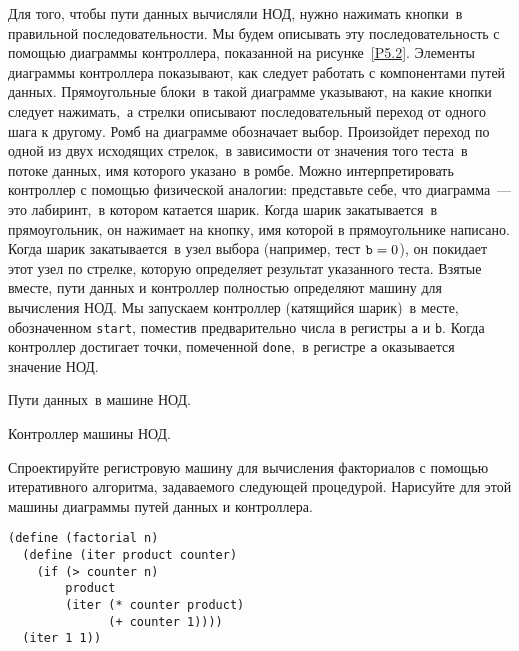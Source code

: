 Для того, чтобы пути данных вычисляли НОД, нужно нажимать
кнопки~в правильной последовательности.  Мы будем описывать эту
последовательность с помощью   диаграммы
контроллера, показанной на 
рисунке~\ref{P5.2}.  Элементы диаграммы контроллера
показывают, как следует работать с компонентами путей данных.
Прямоугольные блоки~в такой диаграмме указывают, на какие кнопки
следует нажимать,~а стрелки описывают последовательный переход от
одного шага к другому.  Ромб на диаграмме обозначает выбор.  Произойдет
переход по одной из двух исходящих стрелок,~в зависимости от значения
того теста~в потоке данных, имя которого указано~в ромбе.  Можно
интерпретировать контроллер с помощью физической аналогии: представьте
себе, что диаграмма~--- это лабиринт,~в котором катается шарик. Когда
шарик закатывается~в прямоугольник, он нажимает на кнопку, имя которой
в прямоугольнике написано.  Когда шарик закатывается~в узел выбора (например,
тест ${\tt b} = 0$), он покидает этот узел по
стрелке, которую определяет результат указанного теста.  Взятые
вместе, пути данных и контроллер полностью определяют машину для
вычисления НОД.  Мы запускаем контроллер (катящийся шарик)~в месте,
обозначенном {\tt start}, поместив предварительно числа в
регистры {\tt a} и {\tt b}.  Когда контроллер достигает
точки, помеченной {\tt done},~в регистре {\tt a}
оказывается значение НОД.


\begin{cntrfig}

\caption{Пути данных~в машине НОД.}
\label{P5.1}
\end{cntrfig}


\begin{cntrfig}

\caption{Контроллер машины НОД.}
\label{P5.2}

\end{cntrfig}
\begin{exercise}{5.1}\label{EX5.1}%
Спроектируйте регистровую машину для вычисления факториалов
с помощью итеративного алгоритма, задаваемого следующей процедурой.
Нарисуйте для этой машины диаграммы путей данных и контроллера.

\begin{Verbatim}[fontsize=\small]
(define (factorial n)
  (define (iter product counter)
    (if (> counter n)
        product
        (iter (* counter product)
              (+ counter 1))))
  (iter 1 1))
\end{Verbatim}
\end{exercise}

